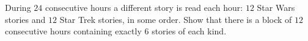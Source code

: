 During $24$ consecutive hours a different story is read each hour: $12$ Star Wars stories and $12$ Star Trek stories, in some order. Show that there is a block of $12$ consecutive hours containing exactly $6$ stories of each kind.
